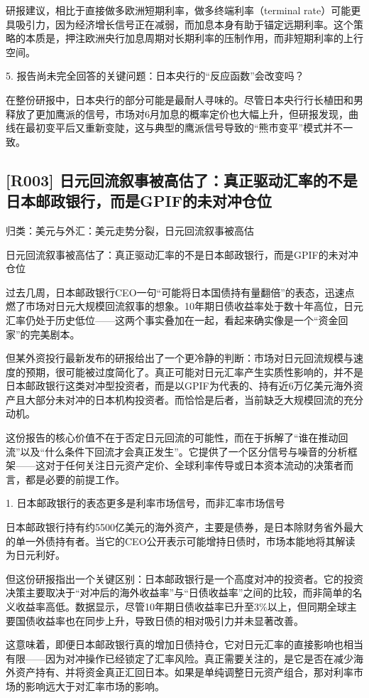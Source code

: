 \documentclass[11pt]{ctexart}
\begin{document}
研报建议，相比于直接做多欧洲短期利率，做多终端利率（terminal rate）可能更具吸引力，因为经济增长信号正在减弱，而加息本身有助于锚定远期利率。这个策略的本质是，押注欧洲央行加息周期对长期利率的压制作用，而非短期利率的上行空间。

5. 报告尚未完全回答的关键问题：日本央行的“反应函数”会改变吗？

在整份研报中，日本央行的部分可能是最耐人寻味的。尽管日本央行行长植田和男释放了更加鹰派的信号，市场对6月加息的概率定价也大幅上升，但研报发现，曲线在最初变平后又重新变陡，这与典型的鹰派信号导致的“熊市变平”模式并不一致。

\subsection{[R003] 日元回流叙事被高估了：真正驱动汇率的不是日本邮政银行，而是GPIF的未对冲仓位}
{\small\color{refgray}归类：美元与外汇：美元走势分裂，日元回流叙事被高估}

日元回流叙事被高估了：真正驱动汇率的不是日本邮政银行，而是GPIF的未对冲仓位

过去几周，日本邮政银行CEO一句“可能将日本国债持有量翻倍”的表态，迅速点燃了市场对日元大规模回流叙事的想象。10年期日债收益率处于数十年高位，日元汇率仍处于历史低位——这两个事实叠加在一起，看起来确实像是一个“资金回家”的完美剧本。

但某外资投行最新发布的研报给出了一个更冷静的判断：市场对日元回流规模与速度的预期，很可能被过度简化了。真正可能对日元汇率产生实质性影响的，并不是日本邮政银行这类对冲型投资者，而是以GPIF为代表的、持有近6万亿美元海外资产且大部分未对冲的日本机构投资者。而恰恰是后者，当前缺乏大规模回流的充分动机。

这份报告的核心价值不在于否定日元回流的可能性，而在于拆解了“谁在推动回流”以及“什么条件下回流才会真正发生”。它提供了一个区分信号与噪音的分析框架——这对于任何关注日元资产定价、全球利率传导或日本资本流动的决策者而言，都是必要的前提工作。

1. 日本邮政银行的表态更多是利率市场信号，而非汇率市场信号

日本邮政银行持有约5500亿美元的海外资产，主要是债券，是日本除财务省外最大的单一外债持有者。当它的CEO公开表示可能增持日债时，市场本能地将其解读为日元利好。

但这份研报指出一个关键区别：日本邮政银行是一个高度对冲的投资者。它的投资决策主要取决于“对冲后的海外收益率”与“日债收益率”之间的比较，而非简单的名义收益率高低。数据显示，尽管10年期日债收益率已升至3\%以上，但同期全球主要国债收益率也在同步上升，导致日债的相对吸引力并未显著改善。

这意味着，即便日本邮政银行真的增加日债持仓，它对日元汇率的直接影响也相当有限——因为对冲操作已经锁定了汇率风险。真正需要关注的，是它是否在减少海外资产持有、并将资金真正汇回日本。如果是单纯调整日元资产组合，那对利率市场的影响远大于对汇率市场的影响。
\end{document}
